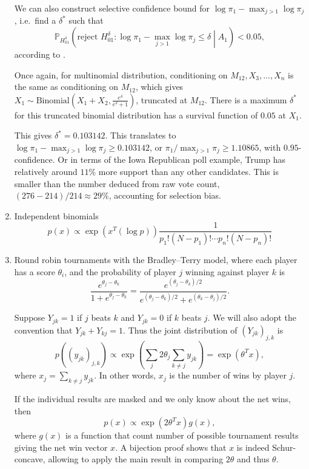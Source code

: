 \documentclass[11pt]{article}
\newcommand{\PP}{\mathbb{P}}
\begin{document}
\begin{enumerate}
We can also construct selective confidence bound for $\log \pi_1 - \max_{j>1} \log \pi_j$, i.e.\ find a $\delta^*$ such that
$$\PP_{H_{01}^\delta} \left(\text{reject } H_{01}^\delta: \log \pi_1 - \max_{j>1} \log \pi_j \le \delta \middle| A_1\right) < 0.05,$$
according to .

Once again, for multinomial distribution, conditioning on $M_{12}, X_3, \ldots, X_n$ is the same as conditioning on $M_{12}$, which gives $X_1 \sim \text{Binomial}\left(X_1 + X_2, \frac{e^\delta}{e^\delta + 1}\right)$, truncated at $M_{12}$. There is a maximum $\delta^*$ for this truncated binomial distribution has a survival function of $0.05$ at $X_1$.

This gives $\delta^* = 0.103142$. This translates to $\log \pi_1 - \max_{j>1} \log \pi_j \ge 0.103142$, or $\pi_1 / \max_{j>1} \pi_j \ge 1.10865$, with $0.95$-confidence. Or in terms of the Iowa Republican poll example, Trump has relatively around $11\%$ more support than any other candidates. This is smaller than the number deduced from raw vote count, $\left(276 - 214\right) / 214 \approx 29\%$, accounting for selection bias.

\item Independent binomials
$$p\left(x\right) \propto \exp\left(x^T \left(\log p\right)\right) \frac{1}{p_1! \left(N-p_1\right)! \cdots p_n! \left(N-p_n\right)!}$$

\item Round robin tournaments with the Bradley--Terry model, where each player has a score $\theta_i$, and the probability of player $j$ winning against player $k$ is
$$\frac{e^{\theta_j - \theta_k}}{1 + e^{\theta_j - \theta_k}} = \frac{e^{\left(\theta_j - \theta_k\right) / 2}}{e^{\left(\theta_j - \theta_k\right) / 2} + e^{\left(\theta_k - \theta_j\right) / 2}}.$$

Suppose $Y_{jk} = 1$ if $j$ beats $k$ and $Y_{jk} = 0$ if $k$ beats $j$. We will also adopt the convention that $Y_{jk} + Y_{kj} = 1$. Thus the joint distribution of $\left(Y_{jk}\right)_{j, k}$ is
$$p\left(\left(y_{jk}\right)_{j, k}\right) \propto \exp\left(\sum_j 2\theta_j \sum_{k \ne j} y_{jk}\right)  = \exp\left(\theta^T x\right),$$
where $x_j = \sum_{k \ne j} y_{jk}$. In other words, $x_j$ is the number of wins by player $j$.

If the individual results are masked and we only know about the net wins, then
$$p\left(x\right) \propto \exp\left(2\theta^T x\right) g\left(x\right),$$
where $g\left(x\right)$ is a function that count number of possible tournament results giving the net win vector $x$. A bijection proof shows that $x$ is indeed Schur-concave, allowing to apply the main result in comparing $2\theta$ and thus $\theta$.

\end{enumerate}



\end{document}
